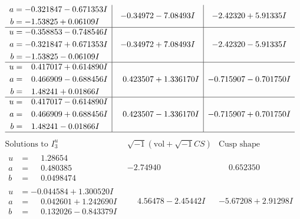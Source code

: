 \documentclass[1p]{elsarticle_modified}
\theoremstyle{definition}
\newcommand{\I}{\sqrt{-1}}
\begin{document}
$$\begin{array}{c|c|c}
\begin{aligned}
a &= -0.321847 - 0.671353 I \\
b &= -1.53825 + 0.06109 I\end{aligned}
 & -0.34972 - 7.08493 I & -2.42320 + 5.91335 I \\ \hline\begin{aligned}
u &= -0.358853 - 0.748546 I \\
a &= -0.321847 + 0.671353 I \\
b &= -1.53825 - 0.06109 I\end{aligned}
 & -0.34972 + 7.08493 I & -2.42320 - 5.91335 I \\ \hline\begin{aligned}
u &= \phantom{-}0.417017 + 0.614890 I \\
a &= \phantom{-}0.466909 - 0.688456 I \\
b &= \phantom{-}1.48241 + 0.01866 I\end{aligned}
 & \phantom{-}0.423507 + 1.336170 I & -0.715907 - 0.701750 I \\ \hline\begin{aligned}
u &= \phantom{-}0.417017 - 0.614890 I \\
a &= \phantom{-}0.466909 + 0.688456 I \\
b &= \phantom{-}1.48241 - 0.01866 I\end{aligned}
 & \phantom{-}0.423507 - 1.336170 I & -0.715907 + 0.701750 I\\
 \hline 
 \end{array}$$\newpage$$\begin{array}{c|c|c}  
\text{Solutions to }I^u_{3}& \I (\text{vol} + \sqrt{-1}CS) & \text{Cusp shape}\\
 \hline 
\begin{aligned}
u &= \phantom{-}1.28654\phantom{ +0.000000I} \\
a &= \phantom{-}0.480385\phantom{ +0.000000I} \\
b &= \phantom{-}0.0498474\phantom{ +0.000000I}\end{aligned}
 & -2.74940\phantom{ +0.000000I} & \phantom{-}0.652350\phantom{ +0.000000I} \\ \hline\begin{aligned}
u &= -0.044584 + 1.300520 I \\
a &= \phantom{-}0.042601 + 1.242690 I \\
b &= \phantom{-}0.132026 - 0.843379 I\end{aligned}
 & \phantom{-}4.56478 - 2.45442 I & -5.67208 + 2.91298 I \\ \hline\begin{aligned}

\end{aligned}
\end{array}$$
\end{document}

